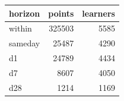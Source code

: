 \begin{tabular}{lrr}
\toprule
horizon & points & learners \\
\midrule
within & 325503 & 5585 \\
sameday & 25487 & 4290 \\
d1 & 24789 & 4434 \\
d7 & 8607 & 4050 \\
d28 & 1214 & 1169 \\
\bottomrule
\end{tabular}
